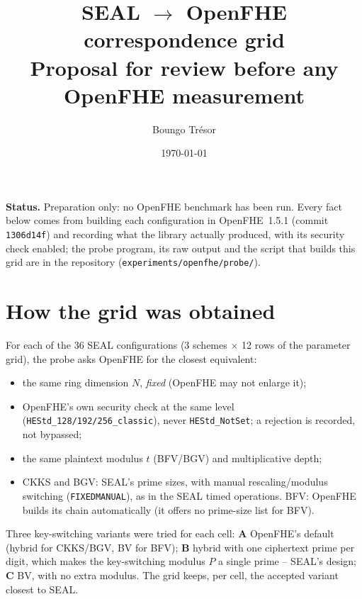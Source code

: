 \documentclass[11pt]{article}
\title{SEAL $\to$ OpenFHE correspondence grid\\[2pt]\large Proposal for review before any OpenFHE measurement}
\author{Boungo Tr\'esor}
\date{\today}
\begin{document}
\maketitle

\noindent\textbf{Status.} Preparation only: no OpenFHE benchmark has been run. Every fact below comes from building each configuration in OpenFHE~1.5.1 (commit \texttt{1306d14f}) and recording what the library actually produced, with its security check enabled; the probe program, its raw output and the script that builds this grid are in the repository (\texttt{experiments/openfhe/probe/}).

\section{How the grid was obtained}

For each of the 36 SEAL configurations (3 schemes $\times$ 12 rows of the parameter grid), the probe asks OpenFHE for the closest equivalent:
\begin{itemize}[leftmargin=*, itemsep=1pt]
  \item the same ring dimension $N$, \emph{fixed} (OpenFHE may not enlarge it);
  \item OpenFHE's own security check at the same level (\texttt{HEStd\_128/192/256\_classic}), never \texttt{HEStd\_NotSet}; a rejection is recorded, not bypassed;
  \item the same plaintext modulus $t$ (BFV/BGV) and multiplicative depth;
  \item CKKS and BGV: SEAL's prime sizes, with manual rescaling/modulus switching (\texttt{FIXEDMANUAL}), as in the SEAL timed operations. BFV: OpenFHE builds its chain automatically (it offers no prime-size list for BFV).
\end{itemize}
Three key-switching variants were tried for each cell: \textbf{A} OpenFHE's default (hybrid for CKKS/BGV, BV for BFV); \textbf{B} hybrid with one ciphertext prime per digit, which makes the key-switching modulus $P$ a single prime -- SEAL's design; \textbf{C} BV, with no extra modulus. The grid keeps, per cell, the accepted variant closest to SEAL.
\end{document}
